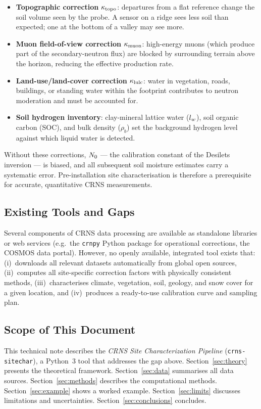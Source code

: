\begin{itemize}[nosep]
  \item \textbf{Topographic correction} $\kappa_\mathrm{topo}$: departures from a
        flat reference change the soil volume seen by the probe.
        A sensor on a ridge sees less soil than expected; one at the
        bottom of a valley may see more.

  \item \textbf{Muon field-of-view correction} $\kappa_\mathrm{muon}$: high-energy
        muons (which produce part of the secondary-neutron flux) are
        blocked by surrounding terrain above the horizon, reducing the
        effective production rate.

  \item \textbf{Land-use/land-cover correction} $\kappa_\mathrm{lulc}$: water in
        vegetation, roads, buildings, or standing water within the
        footprint contributes to neutron moderation and must be
        accounted for.

  \item \textbf{Soil hydrogen inventory}: clay-mineral lattice water
        ($l_w$), soil organic carbon (SOC), and bulk density ($\rho_b$)
        set the background hydrogen level against which liquid water
        is detected.
\end{itemize}

Without these corrections, $N_0$ — the calibration constant of
the Desilets inversion — is biased, and all subsequent soil moisture
estimates carry a systematic error.
Pre-installation site characterisation is therefore a prerequisite
for accurate, quantitative CRNS measurements.

\subsection{Existing Tools and Gaps}

Several components of CRNS data processing are available as standalone
libraries or web services (e.g.\ the \texttt{crnpy} Python package for
operational corrections, the COSMOS data portal).
However, no openly available, integrated tool exists that:
(i)~downloads all relevant datasets automatically from global open
sources,
(ii)~computes all site-specific correction factors with physically
consistent methods,
(iii)~characterises climate, vegetation, soil, geology, and snow
cover for a given location, and
(iv)~produces a ready-to-use calibration curve and sampling plan.

\subsection{Scope of This Document}

This technical note describes the \emph{CRNS Site Characterization
Pipeline} (\texttt{crns-sitechar}), a Python~3 tool that addresses the
gap above.
Section~\ref{sec:theory} presents the theoretical framework.
Section~\ref{sec:data} summarises all data sources.
Section~\ref{sec:methods} describes the computational methods.
Section~\ref{sec:example} shows a worked example.
Section~\ref{sec:limits} discusses limitations and uncertainties.
Section~\ref{sec:conclusions} concludes.
